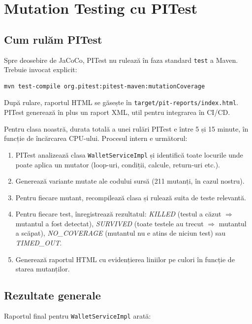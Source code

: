 \chapter{Mutation Testing cu PITest}
\label{ch:pitest}

\section{Cum rulăm PITest}

Spre deosebire de JaCoCo, PITest nu rulează în faza standard \texttt{test} a Maven. Trebuie invocat explicit:

\begin{lstlisting}[style=plainstyle]
mvn test-compile org.pitest:pitest-maven:mutationCoverage
\end{lstlisting}

După rulare, raportul HTML se găsește în \texttt{target/pit-reports/index.html}. PITest generează în plus un raport XML, util pentru integrarea în CI/CD.

Pentru clasa noastră, durata totală a unei rulări PITest e între 5 și 15 minute, în funcție de încărcarea CPU-ului. Procesul intern e următorul:

\begin{enumerate}
    \item PITest analizează clasa \texttt{WalletServiceImpl} și identifică toate locurile unde poate aplica un mutator (loop-uri, condiții, calcule, return-uri etc.).
    \item Generează variante mutate ale codului sursă (211 mutanți, în cazul nostru).
    \item Pentru fiecare mutant, recompilează clasa și rulează suita de teste relevantă.
    \item Pentru fiecare test, înregistrează rezultatul: \textit{KILLED} (testul a căzut $\Rightarrow$ mutantul a fost detectat), \textit{SURVIVED} (toate testele au trecut $\Rightarrow$ mutantul a scăpat), \textit{NO\_COVERAGE} (mutantul nu e atins de niciun test) sau \textit{TIMED\_OUT}.
    \item Generează raportul HTML cu evidențierea liniilor pe culori în funcție de starea mutanților.
\end{enumerate}

\section{Rezultate generale}

Raportul final pentru \texttt{WalletServiceImpl} arată:

